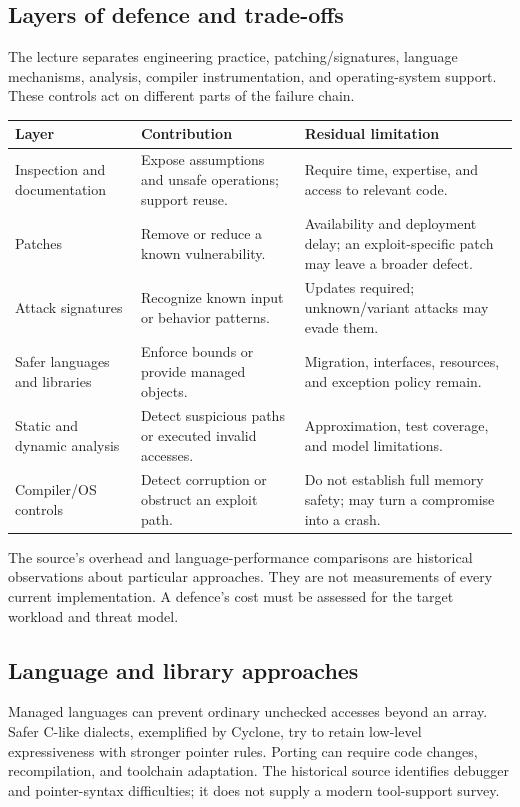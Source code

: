 \documentclass[11pt,a4paper]{article}
\numberwithin{figure}{section}
\begin{document}
\subsection{Layers of defence and trade-offs}
The lecture separates engineering practice, patching/signatures, language mechanisms, analysis, compiler instrumentation, and operating-system support. These controls act on different parts of the failure chain.
\par\noindent\begin{tabularx}{\linewidth}{@{}>{\raggedright\arraybackslash}p{28mm}YY@{}}\toprule
Layer & Contribution & Residual limitation\\\midrule
Inspection and documentation & Expose assumptions and unsafe operations; support reuse. & Require time, expertise, and access to relevant code.\\
Patches & Remove or reduce a known vulnerability. & Availability and deployment delay; an exploit-specific patch may leave a broader defect.\\
Attack signatures & Recognize known input or behavior patterns. & Updates required; unknown/variant attacks may evade them.\\
Safer languages and libraries & Enforce bounds or provide managed objects. & Migration, interfaces, resources, and exception policy remain.\\
Static and dynamic analysis & Detect suspicious paths or executed invalid accesses. & Approximation, test coverage, and model limitations.\\
Compiler/OS controls & Detect corruption or obstruct an exploit path. & Do not establish full memory safety; may turn a compromise into a crash.\\\bottomrule
\end{tabularx}\par

The source's overhead and language-performance comparisons are historical observations about particular approaches. They are not measurements of every current implementation. A defence's cost must be assessed for the target workload and threat model.

\subsection{Language and library approaches}
Managed languages can prevent ordinary unchecked accesses beyond an array. Safer C-like dialects, exemplified by Cyclone, try to retain low-level expressiveness with stronger pointer rules. Porting can require code changes, recompilation, and toolchain adaptation. The historical source identifies debugger and pointer-syntax difficulties; it does not supply a modern tool-support survey.
\end{document}
